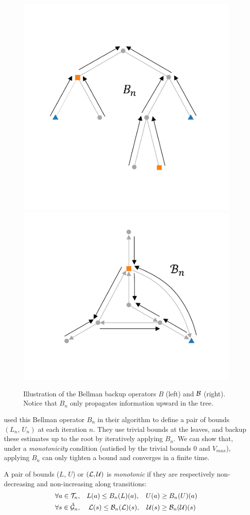 \begin{figure}[tp]
	\centering
	\includegraphics[trim={2.0cm 2.9cm 2.5cm 3.1cm}, clip,width=0.44\linewidth]{img/gbop/tree_2}
	\hfill
	\includegraphics[trim={2.7cm 2.7cm 2.7cm 1.1cm}, clip,width=0.44\linewidth]{img/gbop/graph_2}
	\caption{Illustration of the Bellman backup operators $B$ (left) and $\mathcal{B}$ (right). Notice that $B_n$ only propagates information upward in the tree.}
	\label{fig:bellman}
\end{figure}

\citet{Hren2008} used this Bellman operator $B_n$ in their \OPD algorithm to define a pair of bounds $(L_n,\, U_n)$ at each iteration $n$. They use trivial bounds at the leaves, and backup these estimates up to the root by iteratively applying $B_n$. We can show that, under a \textit{monotonicity} condition (satisfied by the trivial bounds $0$ and $V_{max}$), applying $B_n$ can only tighten a bound and converges in a finite time.

\begin{definition}[Monotonicity]
	\begin{leftbar}[defnbar]
	A pair of bounds ($L$, $U$) or $(\mathcal{L}, \mathcal{U})$ is \emph{monotonic} if they are respectively non-decreasing and non-increasing along transitions:
	\begin{align*}
	\forall a\in{\mathcal{T}}_n, \quad & L(a) \leq B_n(L)(a), & U(a) & \geq B_n(U)(a)\\
	\forall s\in\mathring{\mathcal{G}}_n, \quad &\; \mathcal{L}(s) \leq \mathcal{B}_n(\mathcal{L})(s),&   \mathcal{U}(s) & \geq \mathcal{B}_n(\mathcal{U})(s)
	\end{align*}
	\end{leftbar}
\end{definition}

